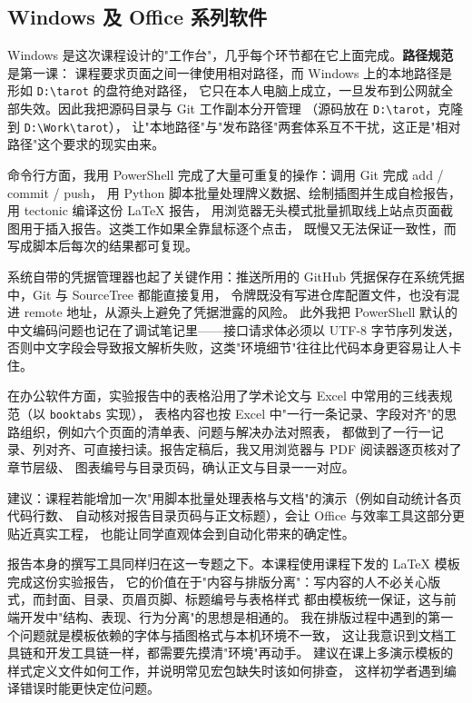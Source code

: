 \documentclass[supercite]{Experimental_Report}
\begin{document}
\subsection{Windows 及 Office 系列软件}

Windows 是这次课程设计的"工作台"，几乎每个环节都在它上面完成。\textbf{路径规范}是第一课：
课程要求页面之间一律使用相对路径，而 Windows 上的本地路径是形如 \texttt{D:\textbackslash tarot} 的盘符绝对路径，
它只在本人电脑上成立，一旦发布到公网就全部失效。因此我把源码目录与 Git 工作副本分开管理
（源码放在 \texttt{D:\textbackslash tarot}，克隆到 \texttt{D:\textbackslash Work\textbackslash tarot}），
让"本地路径"与"发布路径"两套体系互不干扰，这正是"相对路径"这个要求的现实由来。

命令行方面，我用 PowerShell 完成了大量可重复的操作：调用 Git 完成 add / commit / push，
用 Python 脚本批量处理牌义数据、绘制插图并生成自检报告，用 tectonic 编译这份 LaTeX 报告，
用浏览器无头模式批量抓取线上站点页面截图用于插入报告。这类工作如果全靠鼠标逐个点击，
既慢又无法保证一致性，而写成脚本后每次的结果都可复现。

系统自带的凭据管理器也起了关键作用：推送所用的 GitHub 凭据保存在系统凭据中，Git 与 SourceTree 都能直接复用，
令牌既没有写进仓库配置文件，也没有混进 remote 地址，从源头上避免了凭据泄露的风险。
此外我把 PowerShell 默认的中文编码问题也记在了调试笔记里——接口请求体必须以 UTF-8 字节序列发送，
否则中文字段会导致报文解析失败，这类"环境细节"往往比代码本身更容易让人卡住。

在办公软件方面，实验报告中的表格沿用了学术论文与 Excel 中常用的三线表规范（以 \texttt{booktabs} 实现），
表格内容也按 Excel 中"一行一条记录、字段对齐"的思路组织，例如六个页面的清单表、问题与解决办法对照表，
都做到了一行一记录、列对齐、可直接扫读。报告定稿后，我又用浏览器与 PDF 阅读器逐页核对了章节层级、
图表编号与目录页码，确认正文与目录一一对应。

建议：课程若能增加一次"用脚本批量处理表格与文档"的演示（例如自动统计各页代码行数、
自动核对报告目录页码与正文标题），会让 Office 与效率工具这部分更贴近真实工程，
也能让同学直观体会到自动化带来的确定性。

报告本身的撰写工具同样归在这一专题之下。本课程使用课程下发的 LaTeX 模板完成这份实验报告，
它的价值在于"内容与排版分离"：写内容的人不必关心版式，而封面、目录、页眉页脚、标题编号与表格样式
都由模板统一保证，这与前端开发中"结构、表现、行为分离"的思想是相通的。
我在排版过程中遇到的第一个问题就是模板依赖的字体与插图格式与本机环境不一致，
这让我意识到文档工具链和开发工具链一样，都需要先摸清"环境"再动手。
建议在课上多演示模板的样式定义文件如何工作，并说明常见宏包缺失时该如何排查，
这样初学者遇到编译错误时能更快定位问题。
\end{document}
